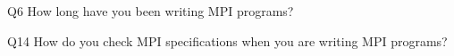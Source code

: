 \begin{description}%
\item{Q6} How long have you been writing MPI programs?%
\item{Q14} How do you check MPI specifications when you are writing MPI programs?%
\end{description}%
